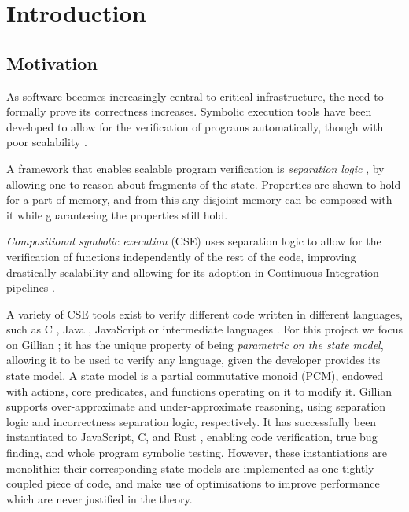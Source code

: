 \chapter{Introduction}

\section{Motivation}

As software becomes increasingly central to critical infrastructure, the need to formally prove its correctness increases. Symbolic execution tools have been developed to allow for the verification of programs automatically, though with poor scalability \cite{surveysymex}.

A framework that enables scalable program verification is \emph{separation logic} \cite{seplogic1,seplogic2}, by allowing one to reason about fragments of the state. Properties are shown to hold for a part of memory, and from this any disjoint memory can be composed with it while guaranteeing the properties still hold.

\emph{Compositional symbolic execution} (CSE) uses separation logic to allow for the verification of functions independently of the rest of the code, improving drastically scalability \cite{pathexplo} and allowing for its adoption in Continuous Integration pipelines \cite{pulse}.

A variety of CSE tools exist to verify different code written in different languages, such as C \cite{verifast,infer,pulse}, Java \cite{jstar,verifast,infer,pulse}, JavaScript \cite{javert1} or intermediate languages \cite{corestar,viper,gillian0}. For this project we focus on Gillian \cite{gillian1,gillian2}; it has the unique property of being \emph{parametric on the state model}, allowing it to be used to verify any language, given the developer provides its state model. A state model is a partial commutative monoid (PCM), endowed with actions, core predicates, and functions operating on it to modify it. Gillian supports over-approximate and under-approximate reasoning, using separation logic and incorrectness separation logic, respectively. It has successfully been instantiated to JavaScript, C, and Rust \cite{gillian0,gillianrust}, enabling code verification, true bug finding, and whole program symbolic testing. However, these instantiations are monolithic: their corresponding state models are implemented as one tightly coupled piece of code, and make use of optimisations to improve performance which are never justified in the theory.

